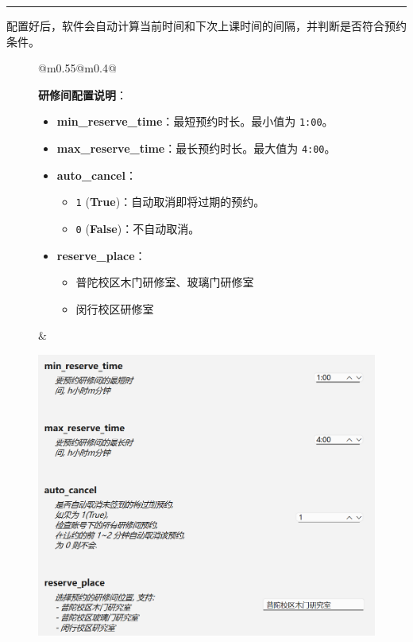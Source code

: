 \documentclass[14pt,a4paper,UTF8,twoside]{article}
\begin{document}
\rule{0.87\textwidth}{0.4pt} %

配置好后，软件会自动计算当前时间和下次上课时间的间隔，并判断是否符合预约条件。

\begin{figure}[H]
    \centering
    \begin{tabular}{@{}m{0.55\textwidth}@{}m{0.4\textwidth}@{}}
        \begin{minipage}[H]{\linewidth}
            \textbf{研修间配置说明}：
            \begin{itemize}[label=--]
                \item \textbf{min\_reserve\_time}：最短预约时长。最小值为 \texttt{1:00}。
                \item \textbf{max\_reserve\_time}：最长预约时长。最大值为 \texttt{4:00}。
                \item \textbf{auto\_cancel}：
                \begin{itemize}
                    \item \texttt{1} (\textbf{True})：自动取消即将过期的预约。
                    \item \texttt{0} (\textbf{False})：不自动取消。
                \end{itemize}
                \item \textbf{reserve\_place}：
                \begin{itemize}
                    \item 普陀校区木门研修室、玻璃门研修室
                    \item 闵行校区研修室
                \end{itemize}
            \end{itemize}
        \end{minipage}
        &
        \begin{minipage}[H]{\linewidth}
            \centering
            \includegraphics[width=\linewidth]{img/studyroom_config.png}
            \label{fig:studyroom_config}
        \end{minipage}
    \end{tabular}
\end{figure}
\end{document}

